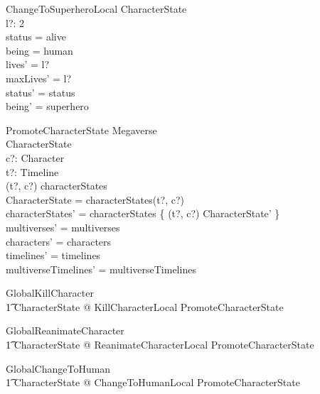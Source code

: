 \documentclass{article}
\begin{document}
\begin{schema}{ChangeToSuperheroLocal}
\Delta CharacterState \\
l?: 2  \\
\where
status = alive \\
being = human \\
lives' = l? \\
maxLives' = l? \\
status' = status \\
being' = superhero \\
\end{schema}

\begin{schema}{PromoteCharacterState}
\Delta Megaverse \\
\Delta CharacterState \\
c?: Character \\
t?: Timeline \\ 
\where 
(t?, c?) \in \dom characterStates \\ 
\theta CharacterState = characterStates(t?, c?) \\
characterStates' = characterStates \oplus \{ (t?, c?) \mapsto \theta CharacterState' \}   \\
multiverses' = multiverses \\
characters' = characters \\
timelines' = timelines \\
multiverseTimelines' = multiverseTimelines \\
\end{schema}

\begin{zed}
GlobalKillCharacter  \\
\t1 \exists \Delta CharacterState @ KillCharacterLocal \land PromoteCharacterState \\ 
\end{zed}

\begin{zed}
GlobalReanimateCharacter  \\
\t1 \exists \Delta CharacterState @ ReanimateCharacterLocal \land PromoteCharacterState \\
\end{zed}

\begin{zed}
GlobalChangeToHuman  \\ 
\t1 \exists \Delta CharacterState @ ChangeToHumanLocal \land PromoteCharacterState \\
\end{zed}
\end{document}

